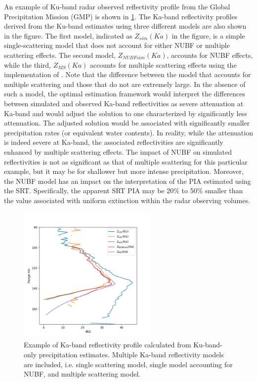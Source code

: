 \documentclass[10pt]{ietbook}
\begin{document}
An example of Ku-band radar observed reflectivity profile from the Global Precipitation Mission (GMP) \cite{gail2017} is shown in \ref{fig:NUBF}.  
The Ka-band reflectivity profiles derived from the Ku-band
estimates using three different models are also shown in the figure.  The first model, indicated as $Z_{sim}(Ka)$ in the figure, is a simple single-scattering 
model that does not account for either NUBF or multiple scattering effects.  The second model, $Z_{NUBFsim}(Ka)$, accounts for NUBF effects, while the third,
$Z_{MS}(Ka)$ accounts for multiple scattering effects using the implementation of \cite{hogan2008}.  Note that the difference between the model that accounts 
for multiple scattering and those that do not
are extremely large.  In the absence of such a model, the optimal estimation framework would interpret the differences between simulated and observed Ka-band
reflectivities as severe attenuation at Ka-band and would adjust the solution to one characterized by significantly less attenuation.  The adjusted solution
would be associated with significantly smaller precipitation rates (or equivalent water contents).  In reality, while the attenuation is indeed severe at 
Ka-band, the associated reflectivities are significantly enhanced by multiple scattering effects.  The impact of NUBF on simulated reflectivities is not 
as significant as that of multiple scattering for this particular example, but it may be for shallower but more intense precipitation.  Moreover, the NUBF
model has an impact on the interpretation of the PIA estimated using the SRT.  Specifically, the apparent SRT PIA may be 20\% to 50\% smaller than the value
associated with uniform extinction within the radar observing volumes.

\begin{figure}  \label{fig:NUBF}
\centering
    \centerline{ }
    \includegraphics[width=0.6\textwidth]{retrievedZKa.png}
    
    \caption{Example of Ka-band reflectivity profile calculated from  Ku-band-only precipitation estimates. Multiple Ka-band reflectivity models are
    included, i.e. single scattering model, single model accounting for NUBF, and multiple scattering model.}
\end{figure}
\end{document}
